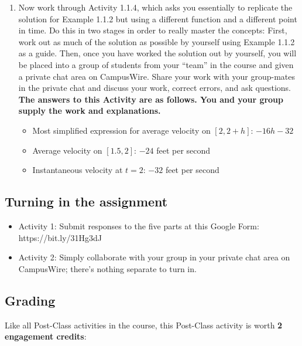 \documentclass[11pt]{article}
\begin{document}
\begin{enumerate}
    \item Now work through Activity 1.1.4, which asks you essentially to replicate the solution for Example 1.1.2 but using a different function and a different point in time. Do this in two stages in order to really master the concepts: First, work out as much of the solution as possible by yourself using Example 1.1.2 as a guide. Then, once you have worked the solution out by yourself, you will be placed into a group of students from your ``team'' in the course and given a private chat area on CampusWire. Share your work with your group-mates in the private chat and discuss your work, correct errors, and ask questions. \textbf{The answers to this Activity are as follows. You and your group supply the work and explanations.}
    \begin{itemize}
        \item Most simplified expression for average velocity on $[2, 2+h]$: $-16h -32$
        \item Average velocity on $[1.5, 2]$: $-24$ feet per second
        \item Instantaneous velocity at $t=2$: $-32$ feet per second
    \end{itemize}
\end{enumerate}

\subsection*{Turning in the assignment}

\begin{itemize}
    \item Activity 1: Submit responses to the five parts at this Google Form: https://bit.ly/31Hg3dJ 
    \item Activity 2: Simply collaborate with your group in your private chat area on CampusWire; there's nothing separate to turn in. 
\end{itemize}

\subsection*{Grading}

Like all Post-Class activities in the course, this Post-Class activity is worth \textbf{2 engagement credits}: 
\end{document}
